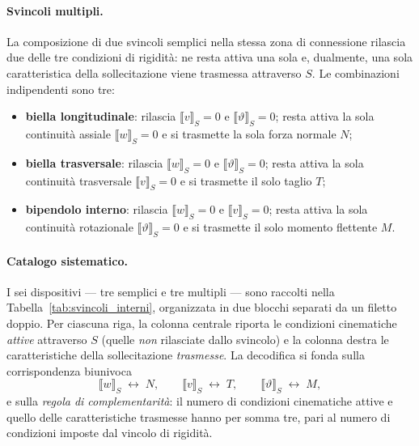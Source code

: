 \paragraph{Svincoli multipli.}
La composizione di due svincoli semplici nella stessa
zona di connessione rilascia due delle tre condizioni
di rigidità: ne resta attiva una sola e, dualmente, una
sola caratteristica della sollecitazione viene
trasmessa attraverso $S$. Le combinazioni indipendenti
sono tre:
\begin{itemize}[nosep]
	\item \textbf{biella longitudinale}: rilascia
	$\llbracket v\rrbracket_S = 0$ e
	$\llbracket\vartheta\rrbracket_S = 0$; resta attiva
	la sola continuità assiale
	$\llbracket w\rrbracket_S = 0$ e si trasmette la
	sola forza normale $N$;
	\item \textbf{biella trasversale}: rilascia
	$\llbracket w\rrbracket_S = 0$ e
	$\llbracket\vartheta\rrbracket_S = 0$; resta attiva
	la sola continuità trasversale
	$\llbracket v\rrbracket_S = 0$ e si trasmette il
	solo taglio $T$;
	\item \textbf{bipendolo interno}: rilascia
	$\llbracket w\rrbracket_S = 0$ e
	$\llbracket v\rrbracket_S = 0$; resta attiva la
	sola continuità rotazionale
	$\llbracket\vartheta\rrbracket_S = 0$ e si trasmette
	il solo momento flettente $M$.
\end{itemize}

\paragraph{Catalogo sistematico.}
I sei dispositivi --- tre semplici e tre multipli ---
sono raccolti nella Tabella~\ref{tab:svincoli_interni},
organizzata in due blocchi separati da un filetto
doppio. Per ciascuna riga, la colonna centrale riporta
le condizioni cinematiche \emph{attive} attraverso $S$
(quelle \emph{non} rilasciate dallo svincolo) e la
colonna destra le caratteristiche della sollecitazione
\emph{trasmesse}. La decodifica si fonda sulla
corrispondenza biunivoca
\[
\llbracket w\rrbracket_S \;\longleftrightarrow\; N,
\qquad
\llbracket v\rrbracket_S \;\longleftrightarrow\; T,
\qquad
\llbracket\vartheta\rrbracket_S \;\longleftrightarrow\; M,
\]
e sulla \emph{regola di complementarità}: il numero di
condizioni cinematiche attive e quello delle
caratteristiche trasmesse hanno per somma tre, pari al
numero di condizioni imposte dal vincolo di rigidità.


